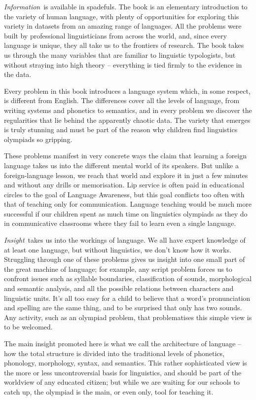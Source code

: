 \textit{Information}\ is available in spadefuls. The book is an elementary introduction to the variety of human language, with plenty of opportunities for exploring this variety in datasets from an amazing range of languages. All the problems were built by professional linguisticians from across the world, and, since every language is unique, they all take us to the frontiers of research. The book takes us through the many variables that are familiar to linguistic typologists, but without straying into high theory – everything is tied firmly to the evidence in the data.

Every problem in this book introduces a language system which, in some respect, is different from English. The differences cover all the levels of language, from writing systems and phonetics to semantics, and in every problem we discover the regularities that lie behind the apparently chaotic data. The variety that emerges is truly stunning and must be part of the reason why children find linguistics olympiads so gripping.

These problems manifest in very concrete ways the claim that learning a foreign language takes us into the different mental world of its speakers. But unlike a foreign-language lesson, we reach that world and explore it in just a few minutes and without any drills or memorisation. Lip service is often paid in educational circles to the goal of Language Awareness, but this goal conflicts too often with that of teaching only for communication. Language teaching would be much more successful if our children spent as much time on linguistics olympiads as they do in communicative classrooms where they fail to learn even a single language.
 
\textit{Insight}\ takes us into the workings of language. We all have expert knowledge of at least one language, but without linguistics, we don't know how it works. Struggling through one of these problems gives us insight into one small part of the great machine of language; for example, any script problem forces us to confront issues such as syllable boundaries, classification of sounds, morphological and semantic analysis, and all the possible relations between characters and linguistic units. It's all too easy for a child to believe that a word's pronunciation and spelling are the same thing, and to be surprised that  only has two sounds. Any activity, such as an olympiad problem, that problematises this simple view is to be welcomed.
 
The main insight promoted here is what we call the architecture of language – how the total structure is divided into the traditional levels of phonetics, phonology, morphology, syntax, and semantics. This rather sophisticated view is the more or less uncontroversial basis for linguistics, and should be part of the worldview of any educated citizen; but while we are waiting for our schools to catch up, the olympiad is the main, or even only, tool for teaching it.
 

